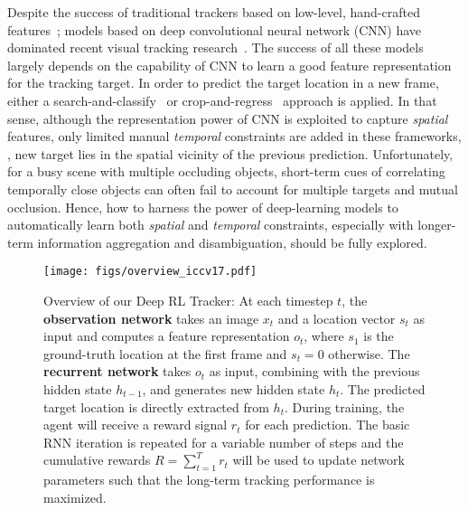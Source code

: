 \documentclass[10pt,twocolumn,letterpaper]{article}
\begin{document}
Despite the success of traditional trackers based on low-level, hand-crafted features~\cite{babenko2011robust,hare2011struck,ross2008incremental}; models based on deep convolutional neural network (CNN) have dominated recent visual tracking research~\cite{nam2015learning,held2016learning,bertinetto2016fully}. The success of all these models largely depends on the capability of CNN to learn a good feature representation for the tracking target. In order to predict the target location in a new frame, either a search-and-classify~\cite{nam2015learning} or crop-and-regress~\cite{held2016learning,bertinetto2016fully} approach is applied. In that sense, although the representation power of CNN is exploited to capture \emph{spatial} features, only limited manual \emph{temporal} constraints are added in these frameworks, \eg, new target lies in the spatial vicinity of the previous prediction.  Unfortunately, for a busy scene with multiple occluding objects, short-term cues of correlating temporally close objects can often fail to account for multiple targets and mutual occlusion. Hence,  how to harness the power of deep-learning models to automatically learn both \emph{spatial} and \emph{temporal} constraints, especially with longer-term information aggregation and disambiguation, should be fully explored. 

\begin{figure*}
\begin{center}
\texttt{[image: figs/overview\_iccv17.pdf]}
\end{center}
   \caption{Overview of our Deep RL Tracker: At each timestep $t$, the \textbf{observation network} takes an image $x_t$ and a location vector $s_t$ as input and computes a feature representation $o_t$, where $s_1$ is the ground-truth location at the first frame and $s_t=0$ otherwise. The \textbf{recurrent network} takes $o_t$ as input, combining with the previous hidden state $h_{t-1}$, and generates new hidden state $h_t$. The predicted target location is directly extracted from $h_t$. During training, the agent will receive a reward signal $r_t$ for each prediction. The basic RNN iteration is repeated for a variable number of steps and the cumulative rewards $R=\sum_{t=1}^{T}r_t$ will be used to update network parameters such that the long-term tracking performance is maximized.}
\label{fig:overview}
\end{figure*}
\end{document}
